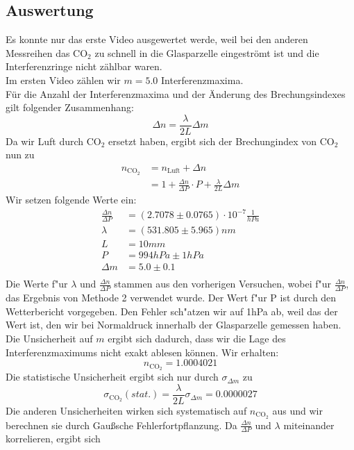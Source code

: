 \documentclass[12pt,a4paper]{article}
\begin{document}
\subsection{Auswertung}
Es konnte nur das erste Video ausgewertet werde, weil bei den anderen Messreihen das CO$_2$ zu schnell in die Glasparzelle eingeströmt ist und die Interferenzringe nicht zählbar waren.\\
Im ersten Video zählen wir $m=5.0$ Interferenzmaxima.\\
Für die Anzahl der Interferenzmaxima und der Änderung des Brechungsindexes gilt folgender Zusammenhang:
\begin{equation}
\Delta n=\frac{\lambda}{2L}\Delta m
\end{equation}
Da wir Luft durch CO$_2$ ersetzt haben, ergibt sich der Brechungindex von CO$_2$ nun zu
\begin{align}
n_{\text{CO}_2}&=n_{\text{Luft}}+\Delta n\nonumber\\
&=1+\frac{\Delta n}{\Delta P}\cdot P+\frac{\lambda}{2L}\Delta m
\end{align}
Wir setzen folgende Werte ein:
\begin{align}
\frac{\Delta n}{\Delta P}&=(2.7078\pm 0.0765)\cdot 10^{-7}\frac{1}{hPa}\\
\lambda&=(531.805\pm 5.965)nm\\
L&=10mm\\
P&=994hPa\pm 1hPa\\
\Delta m&=5.0\pm 0.1\\
\end{align}
Die Werte f"ur $\lambda$ und $\frac{\Delta n}{\Delta P}$ stammen aus den vorherigen Versuchen, wobei f"ur $\frac{\Delta n}{\Delta P}$, das Ergebnis von Methode 2 verwendet wurde. Der Wert f"ur P ist durch den Wetterbericht vorgegeben. Den Fehler sch"atzen wir auf 1hPa ab, weil das der Wert ist, den wir bei Normaldruck innerhalb der Glasparzelle gemessen haben. Die Unsicherheit auf $m$ ergibt sich dadurch, dass wir die Lage des Interferenzmaximums nicht exakt ablesen können. Wir erhalten:
\begin{equation}
n_{\text{CO}_2}=1.0004021
\end{equation} 
Die statistische Unsicherheit ergibt sich nur durch $\sigma_{\Delta m}$ zu
\begin{equation}
\sigma_{\text{CO}_2}(stat.)=\frac{\lambda}{2L}\sigma_{\Delta m}=0.0000027
\end{equation}
Die anderen Unsicherheiten wirken sich systematisch auf $n_{\text{CO}_2}$ aus und wir berechnen sie durch Gaußsche Fehlerfortpflanzung. Da $\frac{\Delta n}{\Delta P}$ und $\lambda$ miteinander korrelieren, ergibt sich
\end{document}
